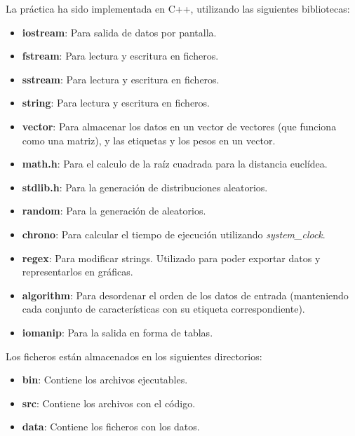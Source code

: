 \documentclass[11pt,a4paper]{article}
\begin{document}
La práctica ha sido implementada en C++, utilizando las siguientes bibliotecas:
\begin{itemize}
\item \textbf{iostream}: Para salida de datos por pantalla.
\item \textbf{fstream}: Para lectura y escritura en ficheros.
\item \textbf{sstream}: Para lectura y escritura en ficheros.
\item \textbf{string}: Para lectura y escritura en ficheros.
\item \textbf{vector}: Para almacenar los datos en un vector de vectores (que funciona como una matriz), y las etiquetas y los pesos en un vector.
\item \textbf{math.h}: Para el calculo de la raíz cuadrada para la distancia euclídea.
\item \textbf{stdlib.h}: Para la generación de distribuciones aleatorios.
\item \textbf{random}: Para la generación de aleatorios.
\item \textbf{chrono}: Para calcular el tiempo de ejecución utilizando \emph{system\_clock}.
\item \textbf{regex}: Para modificar strings. Utilizado para poder exportar datos y representarlos en gráficas.
\item \textbf{algorithm}: Para desordenar el orden de los datos de entrada (manteniendo cada conjunto de características con su etiqueta correspondiente).
\item \textbf{iomanip}: Para la salida en forma de tablas.
\end{itemize}

Los ficheros están almacenados en los siguientes directorios:
\begin{itemize}
\item \textbf{bin}: Contiene los archivos ejecutables.
\item \textbf{src}: Contiene los archivos con el código.
\item \textbf{data}: Contiene los ficheros con los datos.
\end{itemize}
\end{document}
